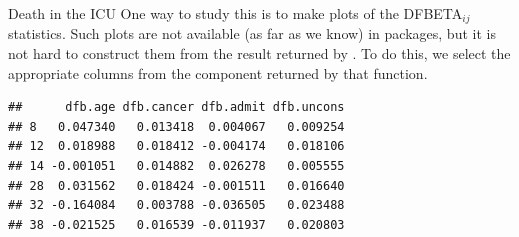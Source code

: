 \documentclass[11pt]{book}
\renewenvironment{knitrout}{\small\renewcommand{\baselinestretch}{.85}}{} %
\begin{document}
\begin{Example}[icu2]{Death in the ICU}
One way to study this is to make plots of the DFBETA$_{ij}$ statistics.
Such plots are not available (as far as we know) in \R packages, but it is not hard
to construct them from the result returned by .
To do this, we select the appropriate columns from the  component returned by that
function.
\begin{knitrout}
\color{fgcolor}\begin{kframe}
\begin{alltt}
 \hlkwb{<-} 
 \hlkwb{<-} \hlopt{$}\hlstd{infmat[,}\hlopt{:}\hlstd{])}
 \hlkwb{<-} \hlstd{(}\hlstd{,} \hlstd{,} \hlstd{,} \hlstd{)}
\end{alltt}
\begin{verbatim}
##      dfb.age dfb.cancer dfb.admit dfb.uncons
## 8   0.047340   0.013418  0.004067   0.009254
## 12  0.018988   0.018412 -0.004174   0.018106
## 14 -0.001051   0.014882  0.026278   0.005555
## 28  0.031562   0.018424 -0.001511   0.016640
## 32 -0.164084   0.003788 -0.036505   0.023488
## 38 -0.021525   0.016539 -0.011937   0.020803
\end{verbatim}
\end{kframe}
\end{knitrout}


\end{Example}
\end{document}

